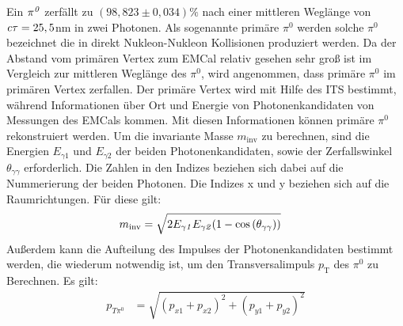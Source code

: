 Ein ${\it \pi^{0}}$ zerf{\"a}llt zu $\left( 98,823\pm0,034\right)\%$ nach einer mittleren Wegl\"ange von ${\it c\tau} = 25,5$nm \cite{webpage:pdg} in zwei Photonen.
Als sogenannte prim\"are $\pi^{0}$ werden solche $\pi^{0}$ bezeichnet die in direkt Nukleon-Nukleon Kollisionen produziert werden.
Da der Abstand vom prim\"aren Vertex zum EMCal relativ gesehen sehr gro{\ss} ist im Vergleich zur mittleren Wegl\"ange des $\pi^{0}$, wird angenommen, dass prim\"are $\pi^{0}$ im prim\"aren Vertex zerfallen.
Der prim\"are Vertex wird mit Hilfe des ITS bestimmt, w\"ahrend Informationen \"uber Ort und Energie von Photonenkandidaten von Messungen des EMCals kommen. 
Mit diesen Informationen k{\"o}nnen prim\"are ${\pi^{0}}$ rekonstruiert werden.
\newline 
Um die invariante Masse $m_{\text{inv}}$ zu berechnen, sind die Energien $E_{\gamma1}$ und $E_{\gamma2}$ der beiden Photonenkandidaten, sowie der Zerfallswinkel $\theta_{\gamma\gamma}$ erforderlich.
\newline
Die Zahlen in den Indizes beziehen sich dabei auf die Nummerierung der beiden Photonen. Die Indizes x und y beziehen sich auf die Raumrichtungen. F{\"u}r diese gilt:
\begin{align}
m_{\text{inv}} &= \sqrt{2E_{\gamma\it{1}}E_{\gamma\it{2}}(1-\cos\left( \theta_{\gamma\gamma}\right) )} \label{eq_invmass}
\end{align}
Au{\ss}erdem kann die Aufteilung des Impulses der Photonenkandidaten bestimmt werden, die wiederum notwendig ist, um den Transversalimpuls $p_\text{T}$ des $\pi^{0}$ zu Berechnen. Es gilt:
\begin{align}
p_{T\pi^{0}} &= \sqrt{\left(p_{x1}+p_{x2}\right)^{2} +\left(p_{y1}+p_{y2}\right)^{2}} \label{eq_pt}
\end{align}
